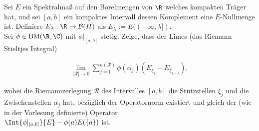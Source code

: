 \begin{exercise}[34/3]

Sei $E$ ein Spektralmaß auf den Borelmengen von $\R$ welches kompakten Träger hat, und sei $[a, b]$ ein kompaktes Intervall dessen Komplement eine $E$-Nullmenge ist.
Definiere $E_\lambda: \R \to \mathcal{B}(H)$ als $E_\lambda := E((-\infty, \lambda])$. \\

Sei $\phi \in \mathrm{BM}(\R, \C)$ mit $\phi |_{[a, b]}$ stetig.
Zeige, dass der Limes (das Riemann-Stieltjes Integral)

\begin{align*}
  \lim_{|\mathcal{R}| \to 0}
  \sum_{j=1}^{n(\mathcal{R})}
  \phi(\alpha_j)
  (E_{\xi_j} - E_{\xi_{j-1}}),
\end{align*}

wobei die Riemannzerlegung $\mathcal{R}$ des Intervalles $[a, b]$ die Stützstellen $\xi_j$ und die Zwischenstellen $\alpha_j$ hat, bezüglich der Operatornorm existiert und gleich der
(wie in der Vorlesung definierte) Operator \\
$\Int{\phi|_{[a,b]}}{E} - \phi(a) E(\{a\})$ ist.

\end{exercise}

